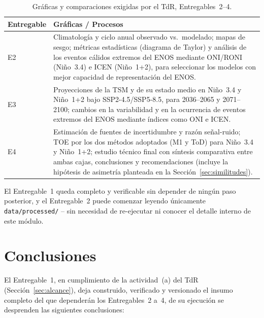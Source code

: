 \documentclass[11pt,a4paper]{article}
\begin{document}
\begin{table}[htbp]
\caption{Gr\'aficas y comparaciones exigidas por el TdR, Entregables~2--4.}
\label{tab:roadmap}
\small
\begin{tabular}{@{}L{2.2cm}L{\dimexpr\textwidth-2.2cm-2\tabcolsep\relax}@{}}
\toprule
\textbf{Entregable} & \textbf{Gr\'aficas / Procesos} \\
\midrule
E2 & Climatolog\'ia y ciclo anual observado vs.\ modelado; mapas de sesgo; m\'etricas estad\'isticas (diagrama de Taylor) y an\'alisis de los eventos c\'alidos extremos del ENOS mediante ONI/RONI (Ni\~no~3.4) e ICEN (Ni\~no~1+2), para seleccionar los modelos con mejor capacidad de representaci\'on del ENOS. \\
E3 & Proyecciones de la TSM y de su estado medio en Ni\~no~3.4 y Ni\~no~1+2 bajo SSP2-4.5/SSP5-8.5, para 2036--2065 y 2071--2100; cambios en la variabilidad y en la ocurrencia de eventos extremos del ENOS mediante \'indices como ONI e ICEN. \\
E4 & Estimaci\'on de fuentes de incertidumbre y raz\'on se\~nal-ruido; TOE por los dos m\'etodos adoptados (M1 y ToD) para Ni\~no~3.4 y Ni\~no~1+2; estudio t\'ecnico final con s\'intesis comparativa entre ambas cajas, conclusiones y recomendaciones (incluye la hip\'otesis de asimetr\'ia planteada en la Secci\'on~\ref{sec:similitudes}). \\
\bottomrule
\end{tabular}
\end{table}
El Entregable~1 queda completo y verificable sin depender de ning\'un paso posterior, y el Entregable~2 puede comenzar leyendo \'unicamente \texttt{data/processed/} -- sin necesidad de re-ejecutar ni conocer el detalle interno de este m\'odulo.


\newpage
\section{Conclusiones}
\label{sec:conclusiones}

El Entregable~1, en cumplimiento de la actividad~(a) del TdR (Secci\'on~\ref{sec:alcance}), deja construido, verificado y versionado el insumo completo del que depender\'an los Entregables~2 a~4, de su ejecuci\'on se desprenden las siguientes conclusiones:
\end{document}
